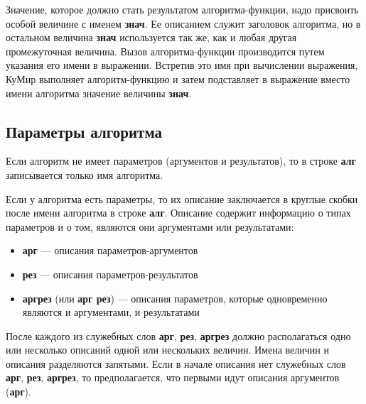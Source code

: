 	Значение, которое должно стать результатом алгоритма-функции, надо присвоить особой величине с именем \textbf{знач}. Ее описанием служит заголовок алгоритма, но в остальном величина \textbf{знач} используется так же, как и любая другая промежуточная величина. Вызов алгоритма-функции производится путем указания его имени в выражении. Встретив это имя при вычислении выражения, КуМир выполняет алгоритм-функцию и затем подставляет в выражение вместо имени алгоритма значение величины \textbf{знач}.

\subsection{Параметры алгоритма}
\label{parameters}

Если алгоритм не имеет параметров (аргументов и результатов), то в строке \textbf{алг} записывается только имя алгоритма.

	Если у алгоритма есть параметры, то их описание заключается в круглые скобки после имени алгоритма в строке \textbf{алг}. Описание содержит информацию о типах параметров и о том, являются они аргументами или результатами:
\begin{itemize}
\item \textbf{арг} --- описания параметров-аргументов
\item \textbf{рез} --- описания параметров-результатов
\item \textbf{аргрез} (или \textbf{арг рез}) --- описания параметров, которые одновременно являются и аргументами, и результатами
\end{itemize}

	После каждого из служебных слов \textbf{арг}, \textbf{рез}, \textbf{аргрез} должно располагаться одно или несколько описаний одной или нескольких величин. Имена величин и описания разделяются запятыми. Если в начале описания нет служебных слов \textbf{арг}, \textbf{рез}, \textbf{аргрез}, то предполагается, что первыми идут описания аргументов (\textbf{арг}).

